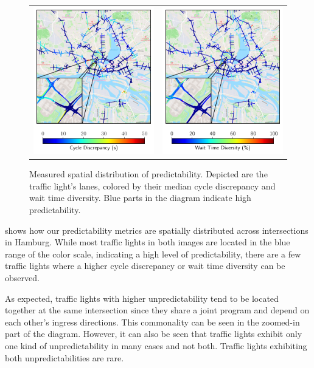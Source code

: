 \begin{figure}[t]
\centering 
\begin{tabular}{@{}cc@{}}
\includegraphics[width=0.46\linewidth]{images/predictability-map.pdf} & \includegraphics[width=0.46\linewidth]{images/predictability-map-diversity.pdf}
\end{tabular}
\caption{Measured spatial distribution of predictability. Depicted are the traffic light's lanes, colored by their median cycle discrepancy and wait time diversity. Blue parts in the diagram indicate high predictability.} \label{fig:predictability-map}
\end{figure}

 shows how our predictability metrics are spatially distributed across intersections in Hamburg. While most traffic lights in both images are located in the blue range of the color scale, indicating a high level of predictability, there are a few traffic lights where a higher cycle discrepancy or wait time diversity can be observed. 

As expected, traffic lights with higher unpredictability tend to be located together at the same intersection since they share a joint program and depend on each other's ingress directions. This commonality can be seen in the zoomed-in part of the diagram. However, it can also be seen that traffic lights exhibit only one kind of unpredictability in many cases and not both. Traffic lights exhibiting both unpredictabilities are rare.

